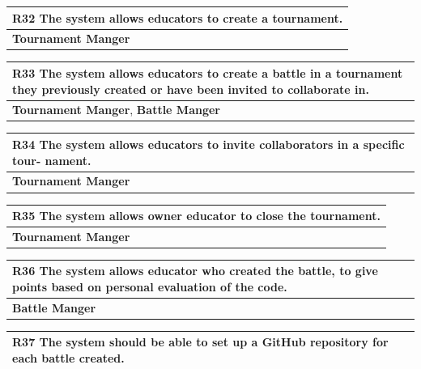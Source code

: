 \documentclass[12pt, a4paper]{report}
\begin{document}
\begin{table}[H]
    \begin{tabularx}{\textwidth}{X}
    \textbf{R32} The system allows educators to create a tournament. \\
    \hline 
    \textbf{Tournament Manger}
    \end{tabularx}
\end{table}

\begin{table}[H]
    \begin{tabularx}{\textwidth}{X}
    \textbf{R33} The system allows educators to create a battle in a tournament they
    previously created or have been invited to collaborate in.\\
    \hline 
    \textbf{Tournament Manger}, \textbf{Battle Manger} 
    \end{tabularx}
\end{table}

\begin{table}[H]
    \begin{tabularx}{\textwidth}{X}
    \textbf{R34} The system allows educators to invite collaborators in a specific tour-
    nament.\\
    \hline 
    \textbf{Tournament Manger}
    \end{tabularx}
\end{table}

\begin{table}[H]
    \begin{tabularx}{\textwidth}{X}
    \textbf{R35} The system allows owner educator to close the tournament.\\
    \hline 
    \textbf{Tournament Manger}
    \end{tabularx}
\end{table}

\begin{table}[H]
    \begin{tabularx}{\textwidth}{X}
    \textbf{R36} The system allows educator who created the battle, to give points based
    on personal evaluation of the code.\\
    \hline 
    \textbf{Battle Manger}
    \end{tabularx}
\end{table}

\begin{table}[H]
    \begin{tabularx}{\textwidth}{X}
    \textbf{R37} The system should be able to set up a GitHub repository for each battle
    created.\\
    \hline 
    \end{tabularx}
\end{table}
\end{document}
